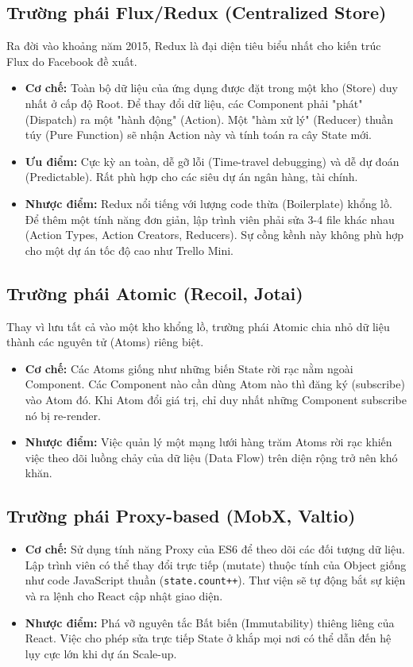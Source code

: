 \subsection{Trường phái Flux/Redux (Centralized Store)}
Ra đời vào khoảng năm 2015, Redux là đại diện tiêu biểu nhất cho kiến trúc Flux do Facebook đề xuất.
\begin{itemize}
    \item \textbf{Cơ chế:} Toàn bộ dữ liệu của ứng dụng được đặt trong một kho (Store) duy nhất ở cấp độ Root. Để thay đổi dữ liệu, các Component phải "phát" (Dispatch) ra một "hành động" (Action). Một "hàm xử lý" (Reducer) thuần túy (Pure Function) sẽ nhận Action này và tính toán ra cây State mới.
    \item \textbf{Ưu điểm:} Cực kỳ an toàn, dễ gỡ lỗi (Time-travel debugging) và dễ dự đoán (Predictable). Rất phù hợp cho các siêu dự án ngân hàng, tài chính.
    \item \textbf{Nhược điểm:} Redux nổi tiếng với lượng code thừa (Boilerplate) khổng lồ. Để thêm một tính năng đơn giản, lập trình viên phải sửa 3-4 file khác nhau (Action Types, Action Creators, Reducers). Sự cồng kềnh này không phù hợp cho một dự án tốc độ cao như Trello Mini.
\end{itemize}

\subsection{Trường phái Atomic (Recoil, Jotai)}
Thay vì lưu tất cả vào một kho khổng lồ, trường phái Atomic chia nhỏ dữ liệu thành các nguyên tử (Atoms) riêng biệt.
\begin{itemize}
    \item \textbf{Cơ chế:} Các Atoms giống như những biến State rời rạc nằm ngoài Component. Các Component nào cần dùng Atom nào thì đăng ký (subscribe) vào Atom đó. Khi Atom đổi giá trị, chỉ duy nhất những Component subscribe nó bị re-render.
    \item \textbf{Nhược điểm:} Việc quản lý một mạng lưới hàng trăm Atoms rời rạc khiến việc theo dõi luồng chảy của dữ liệu (Data Flow) trên diện rộng trở nên khó khăn.
\end{itemize}

\subsection{Trường phái Proxy-based (MobX, Valtio)}
\begin{itemize}
    \item \textbf{Cơ chế:} Sử dụng tính năng Proxy của ES6 để theo dõi các đối tượng dữ liệu. Lập trình viên có thể thay đổi trực tiếp (mutate) thuộc tính của Object giống như code JavaScript thuần (\texttt{state.count++}). Thư viện sẽ tự động bắt sự kiện và ra lệnh cho React cập nhật giao diện.
    \item \textbf{Nhược điểm:} Phá vỡ nguyên tắc Bất biến (Immutability) thiêng liêng của React. Việc cho phép sửa trực tiếp State ở khắp mọi nơi có thể dẫn đến hệ lụy cực lớn khi dự án Scale-up.
\end{itemize}


